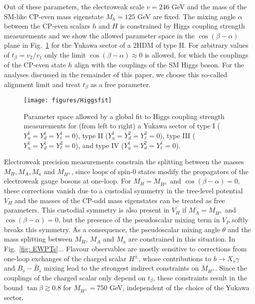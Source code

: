\documentclass[12pt]{article}
\renewcommand\({\left(}
\renewcommand\){\right)}
\renewcommand\[{\left[}
\renewcommand\]{\right]}
\begin{document}
Out of these parameters, the electroweak scale $v=246$ GeV and the mass of the SM-like CP-even mass eigenstate $M_h=125$ GeV are fixed. The mixing angle $\alpha$ between the CP-even scalars $h$ and $H$ is constrained by Higgs coupling strength measurements \cite{} and we show the allowed parameter space in the $\cos(\beta-\alpha)$ plane in  Fig.~\ref{fig:higgsfit} for the Yukawa sector of a 2HDM of type II.  For arbitrary values of $t_\beta=v_2/v_1$ only the limit $\cos(\beta-\alpha)\approx 0$ is allowed, for which the couplings of the CP-even state $h$ align with the couplings of the SM Higgs boson. For the analyses discussed in the remainder of this paper, we choose this so-called alignment limit and treat $t_\beta$ as a free parameter.
\begin{figure}[t]
\texttt{[image: figures/Higgsfit]}
\caption{\label{fig:higgsfit} Parameter space allowed by a global fit to Higgs coupling strength measurements for (from left to right) a Yukawa sector of type I ($Y_u^1  = Y_d^1 = Y_\ell^1 =0$), type II ($Y_u^1 = Y_d^2 = Y_\ell^2 =0$),  type III ($Y_u^1 = Y_d^1 = Y_\ell^2 =0$), and type IV ($Y_u^1  = Y_d^2 = Y_\ell^1 =0$). }
\end{figure}
Electroweak precision measurements constrain the splitting between the masses $M_H, M_A, M_a$ and $M_{H^\pm}$, since loops of spin-0 states modify the propagators of the electroweak gauge bosons at one-loop. For $M_H=M_{H^\pm}$ and $\cos(\beta-\alpha)=0$, these corrections vanish due to a custodial symmetry in the tree-level potential $V_H$ \cite{} and the masses of the CP-odd mass eigenstates can be treated as free parameters. This custodial symmetry is also present in $V_H$ if $M_A=M_{H^\pm}$ and $\cos(\beta-\alpha)=0$, but the presence of the pseudoscalar mixing term in $V_P$ softly breaks this symmetry. As a consequence, the pseudoscalar mixing angle $\theta$ and the mass splitting between $M_H$, $M_A$ and $M_a$ are constrained in this situation. In Fig.~\ref{fig: EWPTs}...
Flavour observables are mostly sensitive to corrections from one-loop exchanges of the charged scalar ${H^\pm}$, whose contributions to $b \to X_s \gamma$ \cite{Hermann:2012fc,Misiak:2015xwa,Czakon:2015exa} and $B_s-\bar B_s$ mixing \cite{Abbott:1979dt,Geng:1988bq,Buras:1989ui,Eberhardt:2013uba} lead to the strongest indirect constraints on $M_{H^\pm}$. Since the couplings of the charged scalar only depend on $t_\beta$, these constraints result in the bound $\tan \beta \gtrsim 0.8$ for $M_{H^\pm}=750$ GeV, independent of the choice of the Yukawa sector.\\
\end{document}
